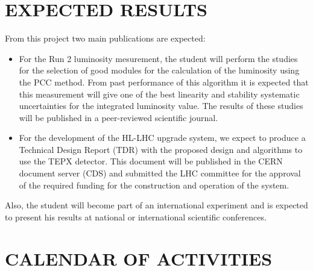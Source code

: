 \documentclass[final,12p]{article}
\begin{document}
\section{EXPECTED RESULTS}

From this project two main publications are expected:
\begin{itemize}
\item
For the Run 2 luminosity mesurement, the student will perform the studies for the selection of good modules for the calculation of the luminosity using the PCC method.
From past performance of this algorithm it is expected that this measurement will give one of the best linearity and stability systematic uncertainties for the integrated luminosity value.
The results of these studies will be published in a peer-reviewed scientific journal.
\item
For the development of the HL-LHC upgrade system, we expect to produce a Technical Design Report (TDR) with the proposed design and algorithms to use the TEPX detector. This document will be published in the CERN document server (CDS) and submitted the LHC committee for the approval of the required funding for the construction and operation of the system.
\end{itemize}

Also, the student will become part of an international experiment and is expected to present his results at national or international scientific conferences.



\section{CALENDAR OF ACTIVITIES}
\end{document}
